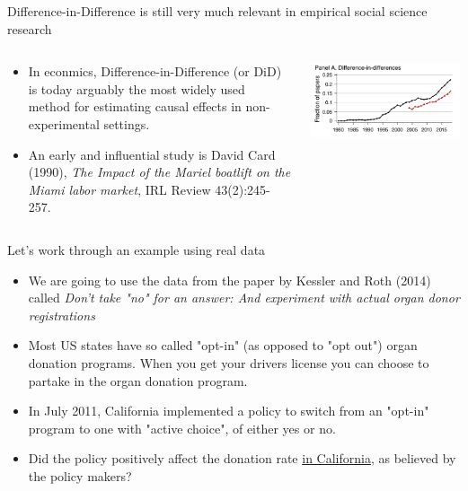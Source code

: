 \documentclass[notes,11pt, aspectratio=169]{beamer}
\begin{document}
\begin{frame}{Difference-in-Difference is still very much relevant in empirical social science research}
\begin{columns}
\begin{column}{0.5\textwidth}
  \begin{itemize}
        \item In econmics, Difference-in-Difference (or DiD) is today arguably the most widely used method for estimating causal effects in non-experimental settings. 
        
        \item An early and influential study is David Card (1990), \emph{The Impact of the Mariel boatlift on the Miami labor market}, IRL Review 43(2):245-257. 
    \end{itemize}
\end{column}

\begin{column}{0.5\textwidth}
 \begin{center}
        \includegraphics[width=1\linewidth]{24_DiDLecture/24_DiDLecture_AEA_DiD.png}
    \end{center}
\end{column}
\end{columns}
\end{frame}

\begin{frame}{Let's work through an example using real data}
\begin{itemize}
    \item We are going to use the data from the paper by Kessler and Roth (2014) called \emph{Don't take "no" for an answer: And experiment with actual organ donor registrations} 
    \item Most US states have so called "opt-in" (as opposed to "opt out") organ donation programs. When you get your drivers license you can choose to partake in the organ donation program.
    \item In July 2011, California implemented a policy to switch from an "opt-in" program to one with "active choice", of either yes or no. 
    \item Did the policy positively affect the donation rate \underline{in California}, as believed by the policy makers? 
\end{itemize}
\end{frame}
\end{document}

